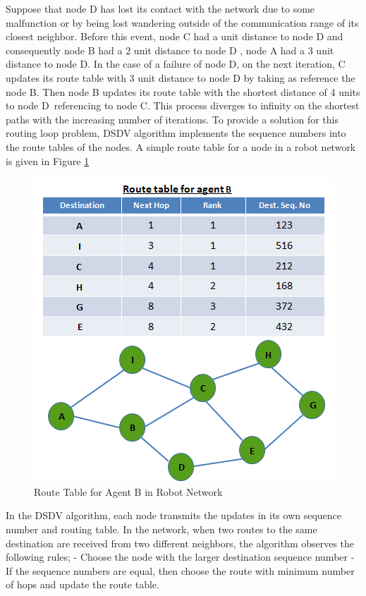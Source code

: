 Suppose that node D has lost its contact with the network due to some malfunction or by being lost wandering outside of the communication range of its closest neighbor. Before this event, node C had a unit distance to node D and consequently node B had a 2 unit distance to node D , node A had a 3 unit distance to node D. In the case of a failure of node D, on the next iteration, C updates its route table with 3 unit distance to node D by taking as reference the node B. Then node B updates its route table with the shortest distance of 4 units to node D\ referencing to node C. This process diverges to infinity on the shortest paths with the increasing number of iterations. To provide a solution for this routing loop problem, DSDV algorithm implements the sequence numbers into the route tables of the nodes. A simple route table for a node in a robot network is given in Figure \ref{dest_seq_ref}

\begin{figure}[H]
\caption{Route Table for Agent B in Robot Network} \label{dest_seq_ref}
\centering
\includegraphics[scale = 0.75]{dest_seq}
\end{figure}

In the DSDV algorithm, each node transmits the updates in its own sequence number and routing table. In the network, when two routes to the same destination are received from two different neighbors, the algorithm observes the following rules;\newline
	- Choose the node with the larger destination sequence number \newline
	- If the sequence numbers are equal, then choose the route with minimum number of hops and update the route table.

